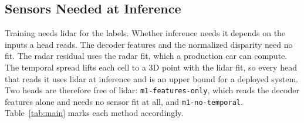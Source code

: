 \subsection{Sensors Needed at Inference}
\label{sec:sensors}

Training needs lidar for the labels. Whether inference needs it depends on the inputs a head reads. The decoder features and the normalized disparity need no fit. The radar residual uses the radar fit, which a production car can compute. The temporal spread lifts each cell to a 3D point with the lidar fit, so every head that reads it uses lidar at inference and is an upper bound for a deployed system. Two heads are therefore free of lidar: \texttt{m1-features-only}, which reads the decoder features alone and needs no sensor fit at all, and \texttt{m1-no-temporal}. Table~\ref{tab:main} marks each method accordingly.

